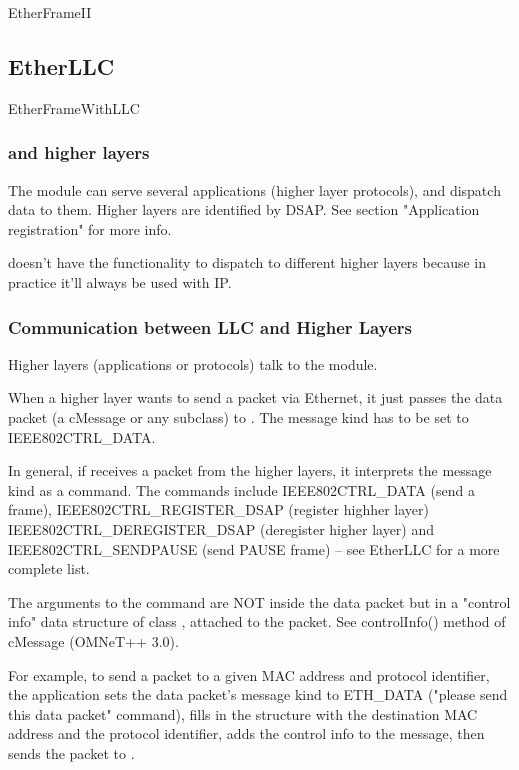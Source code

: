 EtherFrameII

\subsection{EtherLLC}

EtherFrameWithLLC


\subsubsection{ and higher layers}

The  module can serve several applications (higher layer protocols),
and dispatch data to them. Higher layers are identified by DSAP.
See section "Application registration" for more info.

 doesn't have the functionality to dispatch to different
higher layers because in practice it'll always be used with IP.

\subsubsection{Communication between LLC and Higher Layers}

Higher layers (applications or protocols) talk to the  module.

When a higher layer wants to send a packet via Ethernet, it just
passes the data packet (a cMessage or any subclass) to .
The message kind has to be set to IEEE802CTRL\_DATA.

In general, if  receives a packet from the higher layers,
it interprets the message kind as a command. The commands include
IEEE802CTRL\_DATA (send a frame), IEEE802CTRL\_REGISTER\_DSAP (register highher layer)
IEEE802CTRL\_DEREGISTER\_DSAP (deregister higher layer) and IEEE802CTRL\_SENDPAUSE
(send PAUSE frame) -- see EtherLLC for a more complete list.

The arguments to the command are NOT inside the data packet but
in a "control info" data structure of class , attached to
the packet. See controlInfo() method of cMessage (OMNeT++ 3.0).

For example, to send a packet to a given MAC address and protocol
identifier, the application sets the data packet's message kind
to ETH\_DATA ("please send this data packet" command),
fills in the  structure with the destination MAC address and
the protocol identifier, adds the control info to the message, then sends
the packet to .

